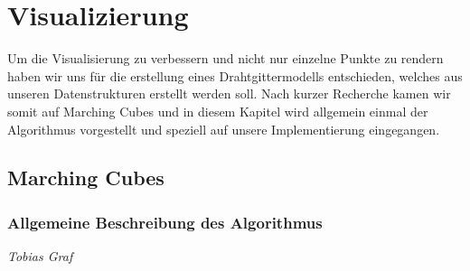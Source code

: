 \pagebreak
\chapter{Visualizierung}
\label{chap:visualisierung}
\thispagestyle{empty}

\noindent Um die Visualisierung zu verbessern und nicht nur einzelne Punkte zu rendern haben wir uns für die erstellung eines Drahtgittermodells entschieden, welches aus unseren Datenstrukturen erstellt werden soll. Nach kurzer Recherche kamen wir somit auf Marching Cubes und in diesem Kapitel wird allgemein einmal der Algorithmus vorgestellt und speziell auf unsere Implementierung eingegangen.

\section{Marching Cubes}
\subsection{Allgemeine Beschreibung des Algorithmus}

\begin{center}
\emph{{\small Tobias Graf}}
\end{center}

\bigskip

